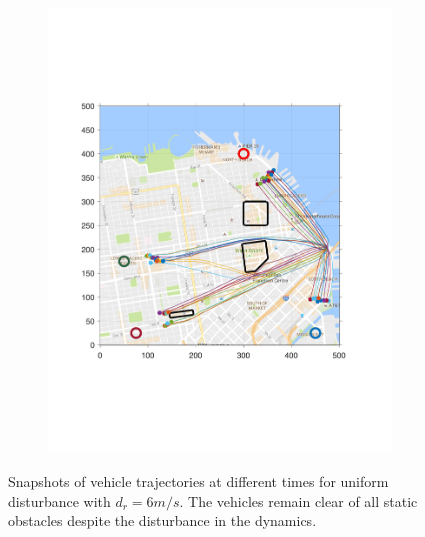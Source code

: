 \begin{figure}[!htb]
\begin{subfigure}{0.5\textwidth}
  \includegraphics[width=\columnwidth]{figs/sf_d6sep0_s4}
  \subcaption{}
  \label{fig:sf_d6sep0_s4}
\end{subfigure}%
\caption{Snapshots of vehicle trajectories at different times for uniform disturbance with $d_{r} = 6 m/s$. The vehicles remain clear of all static obstacles despite the disturbance in the dynamics.}
\label{fig:trajectories_sf_snapshots}
\end{figure}

